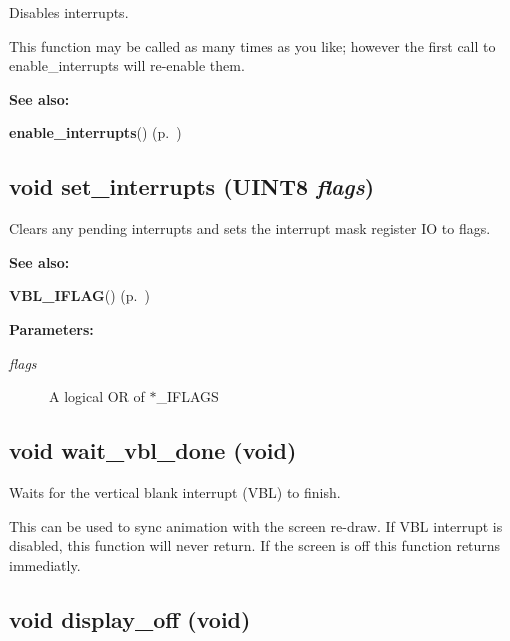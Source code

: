 Disables interrupts.

This function may be called as many times as you like; however the first call to enable\_\-interrupts will re-enable them. \begin{Desc}
\item[{\bf See also: }]\par
{\bf enable\_\-interrupts}() {\rm (p.~\pageref{gb.h_a71})} \end{Desc}
\label{gb.h_a73}
\subsection{\setlength{\rightskip}{0pt plus 5cm}void set\_\-interrupts ({\bf UINT8} {\em flags})}

Clears any pending interrupts and sets the interrupt mask register IO to flags.

\begin{Desc}
\item[{\bf See also: }]\par
{\bf VBL\_\-IFLAG}() {\rm (p.~\pageref{gb.h_a17})} \end{Desc}
\begin{Desc}
\item[{\bf Parameters: }]\par
\begin{description}
\item[
{\em flags}] A logical OR of $\ast$\_\-IFLAGS \end{description}
\end{Desc}
\label{gb.h_a75}
\subsection{\setlength{\rightskip}{0pt plus 5cm}void wait\_\-vbl\_\-done (void)}

Waits for the vertical blank interrupt (VBL) to finish.

This can be used to sync animation with the screen re-draw. If VBL interrupt is disabled, this function will never return. If the screen is off this function returns immediatly. \label{gb.h_a76}
\subsection{\setlength{\rightskip}{0pt plus 5cm}void display\_\-off (void)}

